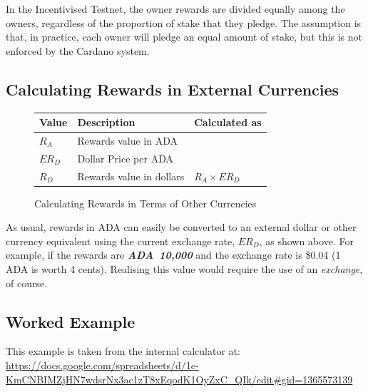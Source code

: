 \documentclass[11pt,a4paper,dvipsnames,twosided,final]{article}
\newcommand{\ada}{ADA{}}
\newcommand{\ADA}[1]{\textbf{\emph{\ada~{#1}}}}
\newcommand{\cardano}[1]{Cardano}
\begin{document}
\noindent
In the Incentivised Testnet, the owner rewards are divided equally among the
owners, regardless of the proportion of stake that they pledge.  The assumption
is that, in practice, each owner will pledge an equal amount of stake, but this
is not enforced by the \cardano{} system.

\subsection{Calculating Rewards in External Currencies}
\label{sec:conversion}

\begin{figure}[h!]
\begin{center}
\begin{tabular}{||l|p{6cm}|l||}
  \hline \hline
\textbf{Value} & \textbf{Description} & \textbf{Calculated as} \\\hline
$R_A$ &  Rewards value in \ada{} &\\\hline
$ER_D$ &  Dollar Price per \ada{} &\\\hline
$R_D$ &  Rewards value in dollars & $R_A \times ER_D$ \\\hline
\hline
\end{tabular}
\end{center}
\caption{Calculating Rewards in Terms of Other Currencies}
\label{fig:monetary}
\end{figure}

\noindent
As usual, rewards in \ada{} can easily be converted to an external dollar or other currency equivalent using
the current exchange rate, $ER_D$, as shown %
above.  For example, if the rewards are \ADA{10,000} and the exchange rate is
\$0.04 (1 \ada{} is worth 4 cents).  Realising this value would require the use of an \emph{exchange},
of course.

\clearpage
\subsection{Worked Example}


This example is taken from the \IOHK{} internal calculator at:
\url{https://docs.google.com/spreadsheets/d/1c-KmCNBIMZjHN7wdsrNx3ac1zT8xEqodK1OyZxC_QIk/edit#gid=1365573139}
\end{document}
